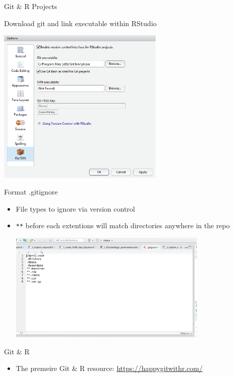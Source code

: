 \documentclass[
  ignorenonframetext,
]{beamer}
\providecommand{\tightlist}{%
  \setlength{\itemsep}{0pt}\setlength{\parskip}{0pt}}
\begin{document}
\begin{frame}{Git \& R Projects}
\protect\hypertarget{git-r-projects}{}

Download git and link executable within RStudio

\includegraphics[width=0.6\textwidth,height=\textheight]{../external/images/setup_1_rstudio_git.PNG}

\end{frame}

\begin{frame}[fragile]{Format .gitignore}
\protect\hypertarget{format-.gitignore}{}

\begin{itemize}[<+->]
\tightlist
\item
  File types to ignore via version control
\item
  \texttt{**} before each extentions will match directories anywhere in
  the repo

  \includegraphics[width=0.75\textwidth,height=\textheight]{../external/images/gitignore.PNG}
\end{itemize}

\end{frame}

\begin{frame}{Git \& R}
\protect\hypertarget{git-r}{}

\begin{itemize}[<+->]
\tightlist
\item
  The premeire Git \& R resource: \url{https://happygitwithr.com/}
\end{itemize}

\end{frame}
\end{document}
